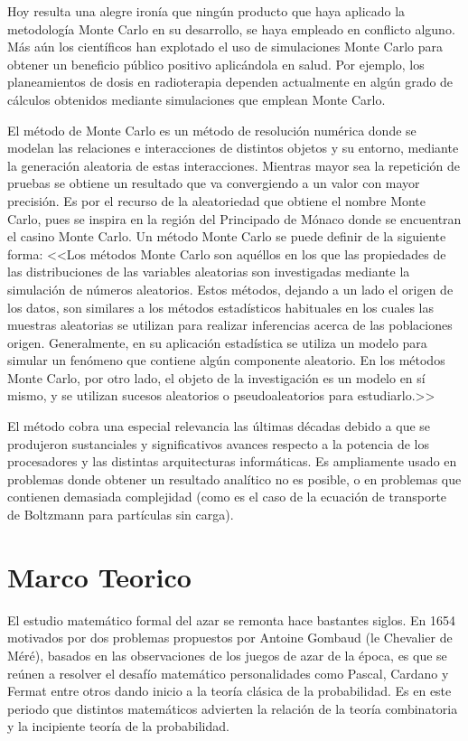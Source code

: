 \documentclass{rbf}
\begin{document}
Hoy resulta una alegre ironía que ningún producto que haya aplicado la metodología Monte Carlo en su desarrollo, se haya empleado en conflicto alguno. Más aún los científicos han explotado el uso de simulaciones Monte Carlo para obtener un beneficio público positivo aplicándola en salud. Por ejemplo, los planeamientos de dosis en radioterapia dependen actualmente en algún grado de cálculos obtenidos mediante simulaciones que emplean Monte Carlo.


El método de Monte Carlo es un método de resolución numérica donde se modelan las relaciones e interacciones de distintos objetos y su entorno, mediante la generación aleatoria de estas interacciones. Mientras mayor sea la repetición de pruebas se obtiene un resultado que va convergiendo a un valor con mayor precisión. Es por el recurso de la aleatoriedad que obtiene el nombre Monte Carlo, pues se inspira en la región del Principado de Mónaco donde se encuentran el casino Monte Carlo.
Un método Monte Carlo se puede definir de la siguiente forma: <<Los métodos Monte Carlo son aquéllos en los que las propiedades de las distribuciones de las variables aleatorias son investigadas mediante la simulación de números aleatorios. Estos métodos, dejando a un lado el origen de los datos, son similares a los métodos estadísticos habituales en los cuales las muestras aleatorias se utilizan para realizar inferencias acerca de las poblaciones origen. Generalmente, en su aplicación estadística se utiliza un modelo para simular un fenómeno que contiene algún componente aleatorio. En los métodos Monte Carlo, por otro lado, el objeto de la investigación es un modelo en sí mismo, y se utilizan sucesos aleatorios o pseudoaleatorios para estudiarlo.>>\cite{Gentle}


El método cobra una especial relevancia las
últimas décadas debido a que se produjeron
sustanciales y significativos avances respecto a la
potencia de los procesadores y las distintas
arquitecturas informáticas. Es ampliamente usado
en problemas donde obtener un resultado
analítico no es posible, o en problemas que
contienen demasiada complejidad (como es el
caso de la ecuación de transporte de Boltzmann
para partículas sin carga).\cite{Kling}
\section{Marco Teorico}\label{inter}
El estudio matemático formal del azar se remonta hace bastantes siglos. En 1654 motivados por dos problemas propuestos por Antoine Gombaud (le Chevalier de Méré), basados en las observaciones de los juegos de azar de la época, es que se reúnen a resolver el desafío matemático personalidades como Pascal, Cardano y Fermat entre otros dando inicio a la teoría clásica de la probabilidad. Es en este periodo que distintos matemáticos advierten la relación de la teoría combinatoria y la incipiente teoría de la probabilidad.
\end{document}
